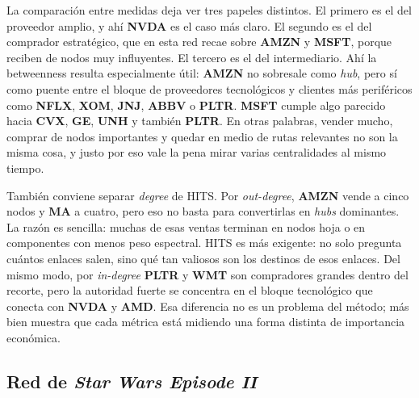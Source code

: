 La comparaci\'on entre medidas deja ver tres papeles distintos. El primero es el del proveedor amplio, y ah\'i \textbf{NVDA} es el caso m\'as claro. El segundo es el del comprador estrat\'egico, que en esta red recae sobre \textbf{AMZN} y \textbf{MSFT}, porque reciben de nodos muy influyentes. El tercero es el del intermediario. Ah\'i la betweenness resulta especialmente \'util: \textbf{AMZN} no sobresale como \textit{hub}, pero s\'i como puente entre el bloque de proveedores tecnol\'ogicos y clientes m\'as perif\'ericos como \textbf{NFLX}, \textbf{XOM}, \textbf{JNJ}, \textbf{ABBV} o \textbf{PLTR}. \textbf{MSFT} cumple algo parecido hacia \textbf{CVX}, \textbf{GE}, \textbf{UNH} y tambi\'en \textbf{PLTR}. En otras palabras, vender mucho, comprar de nodos importantes y quedar en medio de rutas relevantes no son la misma cosa, y justo por eso vale la pena mirar varias centralidades al mismo tiempo.

Tambi\'en conviene separar \textit{degree} de HITS. Por \textit{out-degree}, \textbf{AMZN} vende a cinco nodos y \textbf{MA} a cuatro, pero eso no basta para convertirlas en \textit{hubs} dominantes. La raz\'on es sencilla: muchas de esas ventas terminan en nodos hoja o en componentes con menos peso espectral. HITS es m\'as exigente: no solo pregunta cu\'antos enlaces salen, sino qu\'e tan valiosos son los destinos de esos enlaces. Del mismo modo, por \textit{in-degree} \textbf{PLTR} y \textbf{WMT} son compradores grandes dentro del recorte, pero la autoridad fuerte se concentra en el bloque tecnol\'ogico que conecta con \textbf{NVDA} y \textbf{AMD}. Esa diferencia no es un problema del m\'etodo; m\'as bien muestra que cada m\'etrica est\'a midiendo una forma distinta de importancia econ\'omica.

\subsection{Red de \textit{Star Wars Episode II}}


